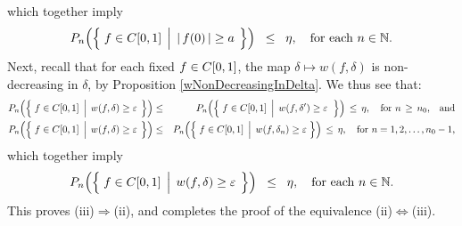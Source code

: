 which together imply
\begin{equation*}
P_{n}\!\left(\left\{\;
	f \in \Czo
	\;\left\vert\;\,
	\vert\,f(0)\,\vert \overset{{\color{white}.}}{\geq} a
	\right.
\;\right\}\right)
\;\;\leq\;\; \eta,
\quad\textnormal{for each $n \in \N$}.
\end{equation*}
Next, recall that for each fixed $f \in C[0,1]$,
the map $\delta \longmapsto w(f,\delta)$ is non-decreasing in $\delta$,
by Proposition \ref{wNonDecreasingInDelta}.
We thus see that:
\begin{eqnarray*}
P_{n}\!\left(\left\{\;
	f \in \Czo
	\;\left\vert\;\,
	w(f,\delta) \overset{{\color{white}.}}{\geq} \varepsilon
	\right.
\;\right\}\right)
&\leq&
	P_{n}\!\left(\left\{\;
		f \in \Czo
		\;\left\vert\;\,
		w(f,\delta^{\prime}) \overset{{\color{white}.}}{\geq} \varepsilon
		\right.
	\,\;\right\}\right)
	\,\leq\, \eta,
	\quad\textnormal{for $n \,\geq\, n_{0}$,\quad and}
\\
P_{n}\!\left(\left\{\;
	f \in \Czo
	\;\left\vert\;\,
	w(f,\delta) \overset{{\color{white}.}}{\geq}  \varepsilon
	\right.
\;\right\}\right)
&\leq&
	P_{n}\!\left(\left\{\;
		f \in \Czo
		\;\left\vert\;\,
		w(f,\delta_{n}) \overset{{\color{white}.}}{\geq} \varepsilon
		\,\right.
	\right\}\right)
	\,\leq\, \eta,
	\quad\textnormal{for $n = 1, 2, \ldots, n_{0}-1$},
\end{eqnarray*}
which together imply
\begin{equation*}
P_{n}\!\left(\left\{\;
	f \in \Czo
	\;\left\vert\;\,
	w(f,\delta) \overset{{\color{white}.}}{\geq} \varepsilon
	\right.
\;\right\}\right)
\;\;\leq\;\; \eta,
\quad\textnormal{for each $n \in \N$}.
\end{equation*}
This proves (iii)\;$\Longrightarrow$\;(ii), and completes the proof of the equivalence
(ii)\;$\Longleftrightarrow$\;(iii).

